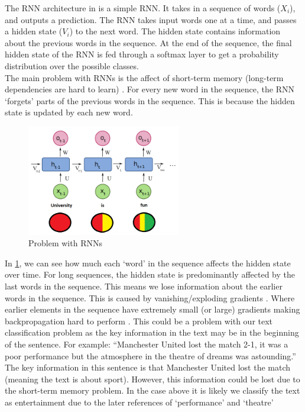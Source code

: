The RNN architecture in  is a simple RNN. It takes in a sequence of words ($X_i$), and outputs a prediction. The RNN takes input
words one at a time, and passes a hidden state ($V_i$) to the next word. The hidden state contains information about the previous words in the
sequence. At the end of the sequence, the final hidden state of the RNN is fed through a softmax layer to get a probability distribution over the
possible classes.\\
The main problem with RNNs is the affect of short-term memory (long-term dependencies are hard to learn) \cite{vangrad}.
For every new word in the sequence, the RNN `forgets' parts of the
previous words in the sequence. This is because the hidden state is updated by each new word.
\begin{figure}[hbtp]
    \centering
    \includegraphics[width=0.6\textwidth]{../images/shortterm-problem.png}
    \caption{Problem with RNNs}
    \label{fig:stm}
\end{figure}

In \cref{fig:stm}, we can see how much each `word' in the sequence affects the hidden state over time. For long sequences,
the hidden state is predominantly affected by the last words in the sequence. This means we lose information about the earlier words
in the sequence. This is caused by vanishing/exploding gradients \cite{vangrad}. Where earlier elements in the sequence have extremely small (or large)
gradients making backpropagation hard to perform \cite{rnn-grad}. This could be a problem with our text classification problem as the key information in the text may be in the
beginning of the sentence. For example: ``Manchester United lost the match 2-1, it was a poor performance but the atmosphere in the
theatre of dreams was astounding.'' The key information in this sentence is that Manchester United lost the match (meaning the text
is about sport). However, this information could be lost due to the short-term memory problem. In the case above it is likely
we classify the text as entertainment due to the later references of `performance' and `theatre'\\
